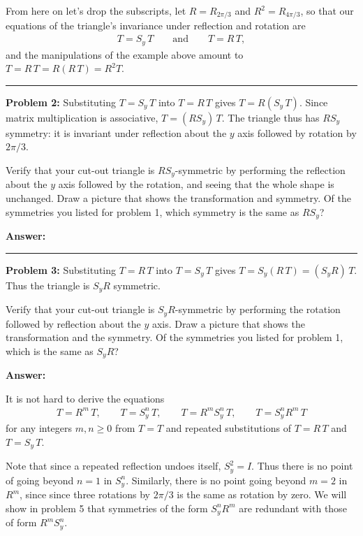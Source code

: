\documentclass[letter]{article}
\newcommand{\Sy}{S_y}
\begin{document}
\pagebreak
From here on let's drop the subscripts, let $R = R_{2\pi/3}$ and $R^2 = R_{4\pi/3}$, so that our 
equations of the triangle's invariance under reflection and rotation are
\begin{align*}
  T = \Sy\, T \quad \quad \text{and} \quad  \quad T = R\, T,
\end{align*}
and the manipulations of the example above amount to $T = R\, T = R (R\, T) = R^2 T$. 


\vspace{4mm}
\rule{\textwidth}{0.5pt}
{\bf Problem 2:} Substituting $T = \Sy\,T$ into $T = R\,T$ gives $T = R (\Sy\, T)$. Since
matrix multiplication is associative, $T = (R \Sy) \,T$. The triangle thus has $R \Sy$
symmetry: it is invariant under reflection about the $y$ axis followed by rotation by $2\pi/3$.

\vspace{2mm}
Verify that your cut-out triangle is $R \Sy$-symmetric by performing the reflection
about the $y$ axis followed by the rotation, and seeing that the whole shape is unchanged.
Draw a picture that shows the transformation and symmetry. Of the symmetries you listed
for problem 1, which symmetry is the same as $R \Sy$?

\vspace{2mm}
{\bf Answer:}

\vspace{64mm}
\rule{\textwidth}{0.5pt}
{\bf Problem 3:}
Substituting $T = R\,T$ into $T = \Sy\,T$ gives $T = \Sy (R \,T) = (\Sy R) \,T$.
Thus the triangle is $\Sy R$ symmetric.

\vspace{2mm}
Verify that your cut-out triangle is $\Sy R$-symmetric by performing the rotation followed
by reflection about the $y$ axis. Draw a picture that shows the transformation and the
symmetry. Of the symmetries you listed for problem 1, which is the same as $\Sy R$?

\vspace{2mm}
{\bf Answer:}

\pagebreak
It is not hard to derive the equations
\begin{align*}
  T = R^m\, T, \quad \quad T = \Sy^n\, T, \quad \quad  T = R^m \Sy^n \, T,  \quad \quad T = \Sy^n R^m \, T
\end{align*}  
for any integers $m,n \geq 0$ from $T=T$ and repeated substitutions of $T = R\,T$ and $T = \Sy\,T$.

\vspace{2mm}
Note that since a repeated reflection undoes itself, $S_y^2 = I$. Thus there is no point of going
beyond $n=1$ in $\Sy^n$. Similarly, there is no point going beyond $m=2$ in $R^m$, since 
since three rotations by $2\pi/3$ is the same as rotation by zero. We will show in problem 5
that symmetries of the form $\Sy^n R^m$ are redundant with those of form $R^m \Sy^n$.
\end{document}

